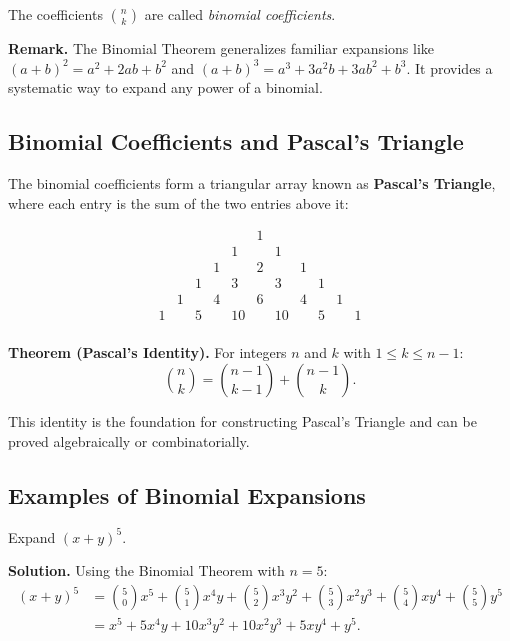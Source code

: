 \documentclass[11pt,a4paper]{article}
\begin{document}
The coefficients $\binom{n}{k}$ are called \textit{binomial coefficients}.

\textbf{Remark.} The Binomial Theorem generalizes familiar expansions like $(a+b)^2 = a^2 + 2ab + b^2$ and $(a+b)^3 = a^3 + 3a^2b + 3ab^2 + b^3$. It provides a systematic way to expand any power of a binomial.

\subsection{Binomial Coefficients and Pascal's Triangle}

The binomial coefficients form a triangular array known as \textbf{Pascal's Triangle}, where each entry is the sum of the two entries above it:

\[
\begin{array}{ccccccccccccc}
    & & & & & 1 & & & & & \\
    & & & & 1 & & 1 & & & & \\
    & & & 1 & & 2 & & 1 & & & \\
    & & 1 & & 3 & & 3 & & 1 & & \\
    & 1 & & 4 & & 6 & & 4 & & 1 & \\
    1 & & 5 & & 10 & & 10 & & 5 & & 1 \\
\end{array}
\]

\textbf{Theorem (Pascal's Identity).} For integers $n$ and $k$ with $1 \leq k \leq n-1$:
\begin{equation*}
    \binom{n}{k} = \binom{n-1}{k-1} + \binom{n-1}{k}.
\end{equation*}

This identity is the foundation for constructing Pascal's Triangle and can be proved algebraically or combinatorially.

\subsection{Examples of Binomial Expansions}

\begin{example}
Expand $(x + y)^5$.

\textbf{Solution.} Using the Binomial Theorem with $n = 5$:
\begin{align*}
    (x + y)^5 &= \binom{5}{0}x^5 + \binom{5}{1}x^4 y + \binom{5}{2}x^3 y^2 + \binom{5}{3}x^2 y^3 + \binom{5}{4}x y^4 + \binom{5}{5}y^5 \\
    &= x^5 + 5x^4y + 10x^3y^2 + 10x^2y^3 + 5xy^4 + y^5.
\end{align*}
\end{example}
\end{document}
